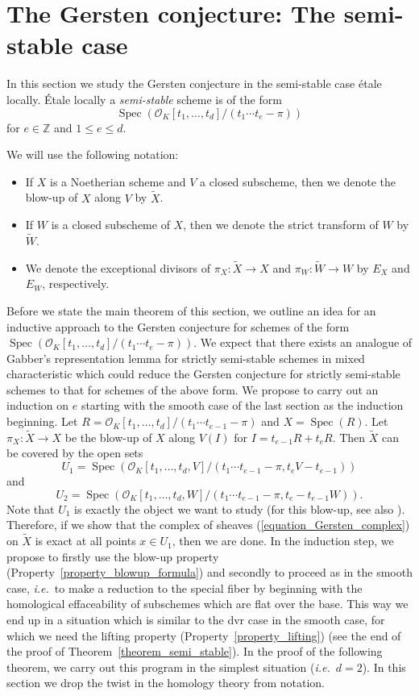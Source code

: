 \documentclass[11pt]{amsart}
\numberwithin{equation}{section}
\newtheorem{Key lemma}[theorem]{Key lemma}
\theoremstyle{definition}
\theoremstyle{remark}
\newcommand{\bb}{\mathbb}
\newcommand{\roi}{\mathcal{O}}
\renewcommand{\tilde}{\widetilde}
\DeclareMathOperator{\Spec}{Spec}
\begin{document}
\section{The Gersten conjecture: The semi-stable case}\label{section_semi_stable_case}

In this section we study the Gersten conjecture in the semi-stable case \'etale locally. \'Etale locally a \textit{semi-stable} scheme is of the form 
$$\Spec(\roi_K[t_1,\ldots,t_d]/(t_1\cdots t_{e}-\pi))$$
for $e\in \bb Z$ and $1\leq e\leq d$.

We will use the following notation:
\begin{itemize}
\item If $X$ is a Noetherian scheme and $V$ a closed subscheme, then we denote the blow-up of $X$ along $V$ by $\tilde{X}$.
\item If $W$ is a closed subscheme of $X$, then we denote the strict transform of $W$ by $\tilde{W}$.
\item We denote the exceptional divisors of $\pi_X\colon\tilde{X}\to X$ and $\pi_W\colon\tilde{W}\to W$ by $E_X$ and $E_W$, respectively. 
\end{itemize}

Before we state the main theorem of this section, we outline an idea for an inductive approach to the Gersten conjecture for schemes of the form $\Spec(\roi_K[t_1,\ldots,t_d]/(t_1\cdots t_{e}-\pi))$. We expect that there exists an analogue of Gabber's representation lemma for strictly semi-stable schemes in mixed characteristic which could reduce the Gersten conjecture for strictly semi-stable schemes to that for schemes of the above form. We propose to carry out an induction on $e$ starting with the smooth case of the last section as the induction beginning. Let $R=\roi_K[t_1,\ldots,t_d]/(t_1\cdots t_{e-1}-\pi)$ and $X=\Spec(R)$. Let $\pi_X\colon\tilde{X}\to X$ be the blow-up of $X$ along $V(I)$ for $I=t_{e-1}R+t_eR$. Then $\tilde{X}$ can be covered by the open sets
$$U_1=\Spec(\roi_K[t_1,\ldots,t_d,V]/(t_1\cdots t_{e-1}-\pi,t_eV-t_{e-1}))$$
and
$$U_2=\Spec(\roi_K[t_1,\ldots,t_d,W]/(t_1\cdots t_{e-1}-\pi,t_e-t_{e-1}W)).$$
Note that $U_1$ is exactly the object we want to study (for this blow-up, see also \cite[Section~3]{Hyodo1988}). Therefore, if we show that the complex of sheaves (\ref{equation_Gersten_complex}) on $\tilde{X}$ is exact at all points $x\in U_1$, then we are done. In the induction step, we propose to firstly use the blow-up property (Property~\ref{property_blowup_formula}) and secondly to proceed as in the smooth case, \textit{i.e.}~to make a reduction to the special fiber by beginning with the homological effaceability of subschemes which are flat over the base. This way we end up in a situation which is similar to the dvr case in the smooth case, for which we need the lifting property (Property~\ref{property_lifting}) (see the end of the proof of Theorem~\ref{theorem_semi_stable}).
In the proof of the following theorem, we carry out this program in the simplest situation (\textit{i.e.}~$d=2$).
In this section we drop the twist in the homology theory from notation. 
\end{document}

